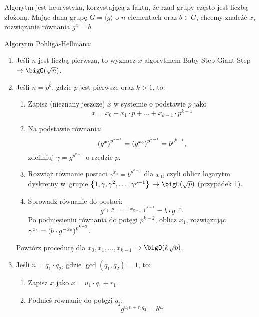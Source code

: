 Algorytm jest heurystyką, korzystającą z faktu, że rząd grupy często jest liczbą złożoną. Mając daną grupę \( G = \langle g \rangle \) o \( n \) elementach oraz \( b \in G \), chcemy znaleźć \( x \), rozwiązanie równania \( g^x = b \).
\begin{greyframe}
    Algorytm Pohliga-Hellmana:
    \begin{enumerate}
        \item Jeśli \( n \) jest liczbą pierwszą, to wyznacz \( x \) algorytmem Baby-Step-Giant-Step \\ \( \rightarrow \bigO(\sqrt{n}) \).
        \item Jeśli \( n = p^k \), gdzie \( p \) jest pierwsze oraz \( k > 1 \), to:
            \begin{enumerate}
                \item Zapisz (nieznany jeszcze) \( x \) w systemie o podstawie \( p \) jako 
                \[
                    x = x_0 + x_1 \cdot p + \ldots + x_{k-1} \cdot p^{k-1}
                \]
                \item Na podstawie równania:
                \[
                    \left(g^x\right)^{p^{k-1}} = \left(g^{x_0}\right)^{p^{k-1}} = b^{p^{k-1}},
                \]
                zdefiniuj \( \gamma = g^{p^{k-1}} \) o rzędzie \( p \).
                \item Rozwiąż równanie postaci \( \gamma^{x_0} = b^{p^{k-1}} \) dla \( x_0 \), czyli oblicz logarytm dyskretny w~grupie \( \set{1, \gamma, \gamma^2, \ldots, \gamma^{p-1}} \) \( \rightarrow \bigO(\sqrt{p}) \) (przypadek 1).
                \item Sprowadź równanie do postaci: 
                \[
                    g^{x_1 \cdot p + \ldots + x_{k-1} \cdot p^{k-1}} = b \cdot g^{-x_0}
                \]
                Po podniesieniu równania do potęgi \( p^{k-2} \), oblicz \( x_1 \), rozwiązując \( \gamma^{x_1} = \left(b \cdot g^{-x_0}\right)^{p^{k-2}} \).
            \end{enumerate}
            Powtórz procedurę dla \( x_0, x_1, \ldots, x_{k-1} \) \( \rightarrow \bigO(k \sqrt{p}) \).
        \item Jeśli \( n  = q_1 \cdot q_2 \), gdzie \( \gcd(q_1, q_2) = 1 \), to:
        \begin{enumerate}
            \item Zapisz \( x \) jako \( x = u_1 \cdot q_1 + r_1 \).
            \item Podnieś równanie do potęgi \( q_2\):
            \[
                g^{u_1n + r_1q_2} = b^{q_2}
            \]

\end{enumerate}
\end{enumerate}
\end{greyframe}
